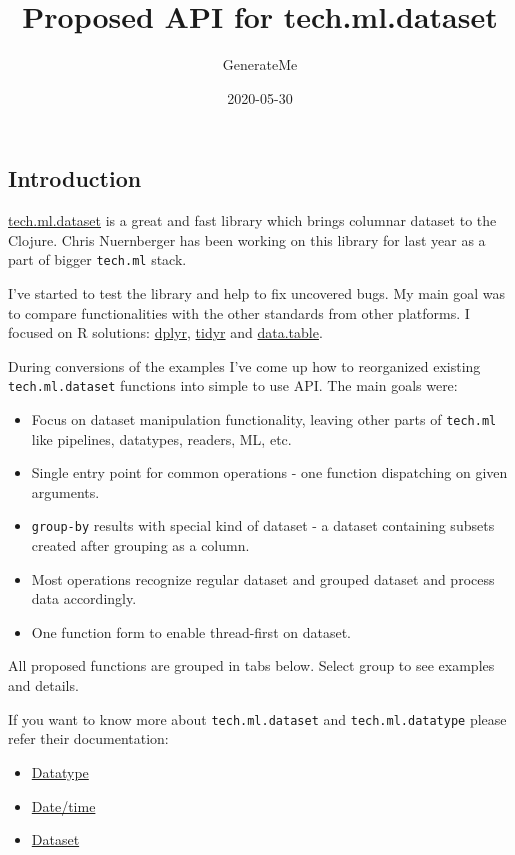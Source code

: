 \documentclass[]{article}
\title{Proposed API for tech.ml.dataset}
\author{GenerateMe}
\date{2020-05-30}
\providecommand{\tightlist}{%
  \setlength{\itemsep}{0pt}\setlength{\parskip}{0pt}}
\begin{document}
\maketitle

\subsection{Introduction}\label{introduction}

\href{https://github.com/techascent/tech.ml.dataset}{tech.ml.dataset} is
a great and fast library which brings columnar dataset to the Clojure.
Chris Nuernberger has been working on this library for last year as a
part of bigger \texttt{tech.ml} stack.

I've started to test the library and help to fix uncovered bugs. My main
goal was to compare functionalities with the other standards from other
platforms. I focused on R solutions:
\href{https://dplyr.tidyverse.org/}{dplyr},
\href{https://tidyr.tidyverse.org/}{tidyr} and
\href{https://rdatatable.gitlab.io/data.table/}{data.table}.

During conversions of the examples I've come up how to reorganized
existing \texttt{tech.ml.dataset} functions into simple to use API. The
main goals were:

\begin{itemize}
\tightlist
\item
  Focus on dataset manipulation functionality, leaving other parts of
  \texttt{tech.ml} like pipelines, datatypes, readers, ML, etc.
\item
  Single entry point for common operations - one function dispatching on
  given arguments.
\item
  \texttt{group-by} results with special kind of dataset - a dataset
  containing subsets created after grouping as a column.
\item
  Most operations recognize regular dataset and grouped dataset and
  process data accordingly.
\item
  One function form to enable thread-first on dataset.
\end{itemize}

All proposed functions are grouped in tabs below. Select group to see
examples and details.

If you want to know more about \texttt{tech.ml.dataset} and
\texttt{tech.ml.datatype} please refer their documentation:

\begin{itemize}
\tightlist
\item
  \href{https://github.com/techascent/tech.datatype/blob/master/docs/cheatsheet.md}{Datatype}
\item
  \href{https://github.com/techascent/tech.datatype/blob/master/docs/datetime.md}{Date/time}
\item
  \href{https://github.com/techascent/tech.ml.dataset/blob/master/docs/walkthrough.md}{Dataset}
\end{itemize}
\end{document}
